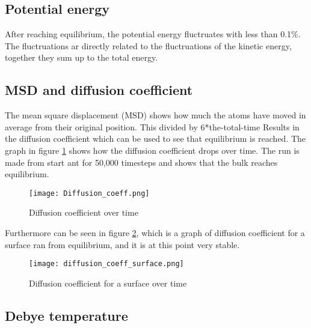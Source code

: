 \subsection{Potential energy}
After reaching equilibrium, the potential energy fluctruates with less than 0.1\%. The fluctruations ar directly related to the fluctruations of the kinetic energy, together they sum up to the total energy.

\subsection{MSD and diffusion coefficient}
The mean square displacement (MSD) shows how much the atoms have moved in average from their original position. This divided by 6*the-total-time Results in the diffusion coefficient which can be used to see that equilibrium is reached. The graph in figure \ref{fig:Diffusion_coeff} shows how the diffusion coefficient drops over time. The run is made from start ant for 50,000 timesteps and shows that the bulk reaches equilibrium. 
\begin{figure}[ht]
	\centering
	\texttt{[image: Diffusion\_coeff.png]}
	\caption{Diffusion coefficient over time}
	\label{fig:Diffusion_coeff}
\end{figure}
Furthermore can be seen in figure \ref{fig:diffusion_coeff_surface}, which is a graph of diffusion coefficient for a surface ran from equilibrium, and it is at this point very stable.
\begin{figure}[ht]
	\centering
	\texttt{[image: diffusion\_coeff\_surface.png]}
	\caption{Diffusion coefficient for a surface over time}
	\label{fig:diffusion_coeff_surface}
\end{figure}

\subsection{Debye temperature}


